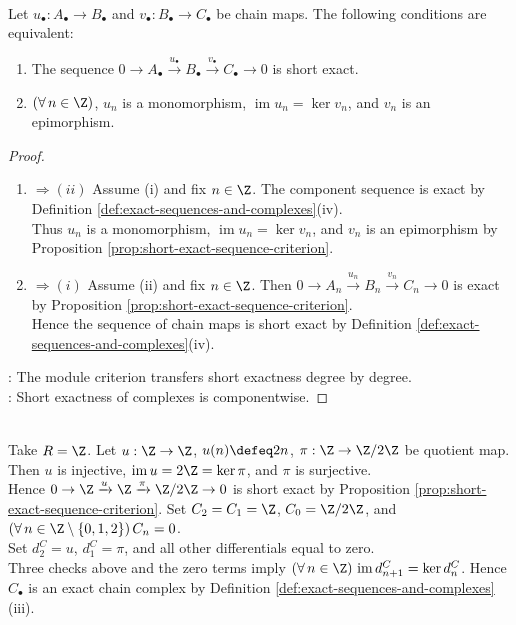 \begin{corollary} \label{cor:short-exact-complexes-degreewise-criterion} \\
Let $u_\bullet:A_\bullet\to B_\bullet$ and $v_\bullet:B_\bullet\to C_\bullet$ be chain maps. The following conditions are equivalent:
\begin{enumerate}[label=(\roman*)]
\setlength{\itemsep}{0pt}
\item The sequence $0\to A_\bullet\xrightarrow{u_\bullet}B_\bullet\xrightarrow{v_\bullet}C_\bullet\to0$ is short exact.
\item $(\forall\,n\in\Z)$, $u_n$ is a monomorphism, $\operatorname{im}u_n=\ker v_n$, and $v_n$ is an epimorphism.
\end{enumerate}
\begin{proof}
\begin{enumerate}[label=(\roman*)]
\setlength{\itemsep}{0pt}
\item[$(i)$] $\Rightarrow (ii)$ Assume (i) and fix $n\in\Z$. The component sequence is exact by Definition \ref{def:exact-sequences-and-complexes}(iv).\\
Thus $u_n$ is a monomorphism, $\operatorname{im}u_n=\ker v_n$, and $v_n$ is an epimorphism by Proposition \ref{prop:short-exact-sequence-criterion}.
\item[$(ii)$] $\Rightarrow (i)$ Assume (ii) and fix $n\in\Z$. Then $0\to A_n\xrightarrow{u_n}B_n\xrightarrow{v_n}C_n\to0$ is exact by Proposition \ref{prop:short-exact-sequence-criterion}.\\
Hence the sequence of chain maps is short exact by Definition \ref{def:exact-sequences-and-complexes}(iv).
\end{enumerate}
: The module criterion transfers short exactness degree by degree.\\
: Short exactness of complexes is componentwise.
\end{proof}
\end{corollary}

\begin{example} \label{ex:integer-short-exact-chain-complex} \\
Take $R=\Z$. Let $u:\Z\to\Z$, $u(n)\defeq2n$, $\pi:\Z\to\Z/2\Z$ be quotient map. Then $u$ is injective, $\operatorname{im}u=2\Z=\ker\pi$, and $\pi$ is surjective.\\
Hence $0\to\Z\xrightarrow{u}\Z\xrightarrow{\pi}\Z/2\Z\to0$ is short exact by Proposition \ref{prop:short-exact-sequence-criterion}. Set $C_2=C_1=\Z$, $C_0=\Z/2\Z$, and $(\forall\,n\in\Z\setminus\{0,1,2\})\,C_n=0$.\\
Set $d^C_2=u$, $d^C_1=\pi$, and all other differentials equal to zero.\\
Three checks above and the zero terms imply $(\forall\,n\in\Z)\,\operatorname{im}d^C_{n+1}=\ker d^C_n$. Hence $C_\bullet$ is an exact chain complex by Definition \ref{def:exact-sequences-and-complexes}(iii).
\end{example}
